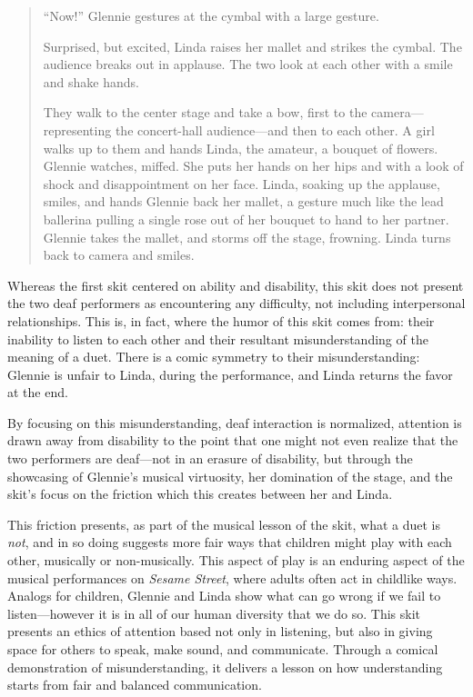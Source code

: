 \documentclass[12pt,letterpaper]{article}
\begin{document}
\begin{quote}
	``Now!'' Glennie gestures at the cymbal with a large gesture. 

	Surprised, but excited, Linda raises her mallet and strikes the cymbal. 
	The audience breaks out in applause. The two look at each other with a 
	smile and shake hands. 

	They walk to the center stage and take a bow, first to the camera---
	representing the concert-hall audience---and then to each other. A girl 
	walks up to them and hands Linda, the amateur, a bouquet of flowers. 
	Glennie watches, miffed. She puts her hands on her hips and with a look 
	of shock and disappointment on her face. Linda, soaking up the applause, 
	smiles, and hands Glennie back her mallet, a gesture much like the lead 
	ballerina pulling a single rose out of her bouquet to hand to her 
	partner. Glennie takes the mallet, and storms off the stage, frowning. 
	Linda turns back to camera and smiles.   
	
	\end{quote}

	Whereas the first skit centered on ability and disability, this skit 
	does not present the two deaf performers as encountering any difficulty,
	not including interpersonal relationships. This is, in fact, where the
	humor of this skit comes from: their inability to listen to each other
	and their resultant misunderstanding of the meaning of a duet. There is
	a comic symmetry to their misunderstanding: Glennie is unfair to Linda, 
	during the performance, and Linda returns the favor at the end. 

	By focusing on this misunderstanding, deaf interaction is normalized,
	attention is drawn away from disability to the point that one might not
	even realize that the two performers are deaf---not in an erasure of 
	disability, but through the showcasing of Glennie's musical virtuosity,
	her domination of the stage, and the skit's focus on the friction
	which this creates between her and Linda.  

	This friction presents, as part of the musical lesson of the skit, 
	what a duet is \textit{not}, and in so doing suggests more fair ways
	that children might play with each other, musically or non-musically.
	This aspect of play is an enduring aspect of the musical performances
	on \textit{Sesame Street}, where adults often act in childlike ways.
	Analogs for children, Glennie and Linda show what can go wrong if we
	fail to listen---however it is in all of our human diversity that we
	do so. This skit presents an ethics of attention based not only in
	listening, but also in giving space for others to speak, make sound,
	and communicate. Through a comical demonstration of misunderstanding, 
	it delivers a lesson on how understanding starts from fair and balanced
	communication.	
\end{document}
